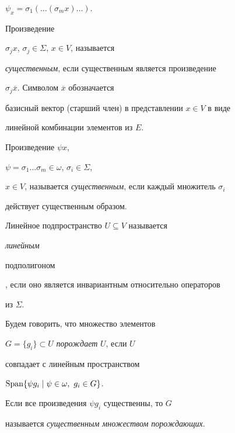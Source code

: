 $\psi_{x}=\sigma_{1}(\dotsc(\sigma_{m} x)\dotsc)$.





\begin{defn}


Произведение


$\sigma_{j} x$, $\sigma_{j}\in\Sigma$, $x\in V$, называется


{\it существенным}, если существенным является произведение


$\sigma_{j}\overline{x}$. Символом $\overline{x}$ обозначается


базисный вектор (старший член) в представлении $x\in V$ в виде


линейной комбинации элементов из $E$.


\end{defn}





\begin{defn}


Произведение $\psi x$,


$\psi=\sigma_{1}\dotsc\sigma_{m}\in\omega$, $\sigma_{i} \in\Sigma$,


$x\in V$, называется {\it существенным}, если каждый множитель $\sigma_{i}$


действует существенным образом.


\end{defn}





\begin{defn}


Линейное подпространство $U\subseteq V$ называется {\it линейным


подполигоном}, если оно является инвариантным относительно операторов


из $\Sigma$.


\end{defn}





\begin{defn}


Будем говорить, что множество элементов


$G=\lbrace g_{i}\rbrace\subset U$ {\it порождает} $U$, если $U$


совпадает с линейным пространством


$\Span\lbrace\psi g_{i}\mid\psi\in\omega,\ g_{i}\in G\rbrace$.


Если все произведения $\psi g_{i}$ существенны, то $G$


называется {\it существенным множеством порождающих}.


\end{defn}





